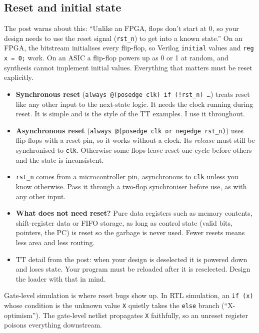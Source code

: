 \subsection{Reset and initial state}\label{sec:reset}

The post warns about this: ``Unlike an FPGA, flops don't start at 0, so your
design needs to use the reset signal (\texttt{rst\_n}) to get into a known
state.'' On an FPGA, the bitstream initialises every flip-flop, so Verilog
\texttt{initial} values and \texttt{reg x = 0;} work. On an ASIC a
flip-flop powers up as 0 or 1 at random, and synthesis cannot implement
initial values. Everything that matters must be reset explicitly.

\begin{itemize}
  \item \textbf{Synchronous reset} (\texttt{always @(posedge clk) if
    (!rst\_n) \ldots}) treats reset like any other input to the next-state
    logic. It needs the clock running during reset. It is simple and is the
    style of the TT examples. I use it throughout.
  \item \textbf{Asynchronous reset} (\texttt{always @(posedge clk or negedge
    rst\_n)}) uses flip-flops with a reset pin, so it works without a clock.
    Its \emph{release} must still be synchronised to \texttt{clk}.
    Otherwise some flops leave reset one cycle before others and the state
    is inconsistent.
  \item \texttt{rst\_n} comes from a microcontroller pin, asynchronous to
    \texttt{clk} unless you know otherwise. Pass it through a two-flop
    synchroniser before use, as with any other input.
  \item \textbf{What does not need reset?} Pure data registers such as
    memory contents, shift-register data or FIFO storage, as long as control
    state (valid bits, pointers, the PC) is reset so the garbage is never
    used. Fewer resets means less area and less routing.
  \item TT detail from the post: when your design is deselected it is
    powered down and loses state. Your program must be reloaded after it is
    reselected. Design the loader with that in mind.
\end{itemize}

Gate-level simulation is where reset bugs show up. In RTL simulation, an
\texttt{if (x)} whose condition is the unknown value \texttt{X} quietly takes
the \texttt{else} branch (``X-optimism''). The gate-level netlist propagates
\texttt{X} faithfully, so an unreset register poisons everything downstream.

